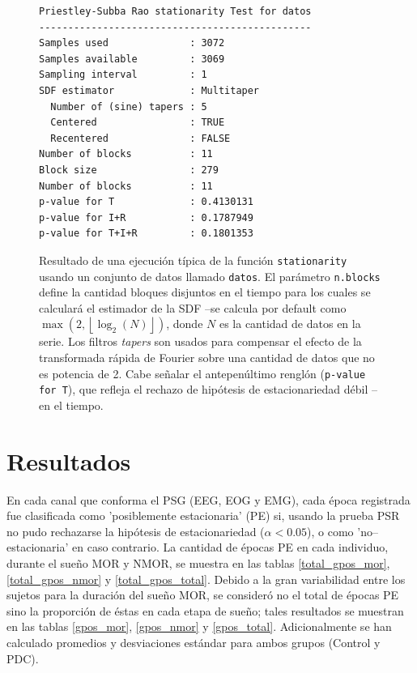 \documentclass[12pt,a4paper]{mitthesis}
\begin{document}
\begin{figure}
\centering
\begin{lstlisting}[caption={}]
Priestley-Subba Rao stationarity Test for datos
-----------------------------------------------
Samples used              : 3072 
Samples available         : 3069 
Sampling interval         : 1 
SDF estimator             : Multitaper 
  Number of (sine) tapers : 5 
  Centered                : TRUE 
  Recentered              : FALSE 
Number of blocks          : 11 
Block size                : 279 
Number of blocks          : 11 
p-value for T             : 0.4130131 
p-value for I+R           : 0.1787949 
p-value for T+I+R         : 0.1801353 
\end{lstlisting}
\caption{Resultado de una ejecuci\'on t\'ipica de la funci\'on \texttt{stationarity} usando un 
conjunto de datos llamado \texttt{datos}. 
El par\'ametro \texttt{n.blocks} define la cantidad bloques disjuntos en el tiempo para los cuales 
se calcular\'a el estimador de la SDF --se calcula por default como
$\max \left( 2 , \left\lfloor \log_2\left( N \right) \right\rfloor \right)$, donde $N$ es la 
cantidad de datos en la serie.
Los filtros \textit{tapers} son usados para compensar el efecto de la transformada r\'apida de
Fourier sobre una cantidad de datos que no es potencia de 2.
Cabe se\~nalar el antepen\'ultimo rengl\'on (\texttt{p-value for T}), que refleja el rechazo de 
hip\'otesis de estacionariedad d\'ebil --en el tiempo.}
\label{res_psr}
\end{figure}


\chapter{Resultados}

En cada canal que conforma el PSG (EEG, EOG y EMG), cada \'epoca registrada fue clasificada como 
'posiblemente estacionaria' (PE) si, usando la prueba PSR no pudo rechazarse la hip\'otesis de 
estacionariedad ($\alpha < 0.05$), o como 'no--estacionaria' en caso contrario.
La cantidad de \'epocas PE en cada individuo, durante el sue\~no MOR y NMOR, se muestra en las 
tablas \ref{total_gpos_mor}, \ref{total_gpos_nmor} y \ref{total_gpos_total}. Debido a la gran 
variabilidad entre los sujetos para la duraci\'on del sue\~no MOR, se consider\'o no el total de 
\'epocas PE sino la proporci\'on de \'estas en cada etapa de sue\~no; tales resultados se muestran 
en las tablas \ref{gpos_mor}, \ref{gpos_nmor} y \ref{gpos_total}. 
Adicionalmente se han calculado promedios y desviaciones est\'andar para ambos grupos (Control y 
PDC).
\end{document}
